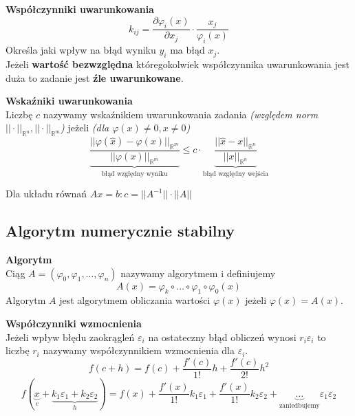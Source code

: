 \documentclass[../mn-notatki.tex]{subfiles}
\begin{document}
\begin{tcolorbox}
\textbf{Współczynniki uwarunkowania}\\
\[
k_{ij} = \frac{\partial \varphi_i(x)}{\partial x_j} \cdot \frac{x_j}{\varphi_i(x)}
\]
    Określa jaki wpływ na błąd wyniku $y_i$ ma błąd $x_j$.\\
     Jeżeli \textbf{wartość bezwzględna} któregokolwiek współczynnika
uwarunkowania jest duża to zadanie jest \textbf{źle uwarunkowane}.

\end{tcolorbox}

\begin{tcolorbox}
\textbf{Wskaźniki uwarunkowania}\\
Liczbę $c$ nazywamy wskaźnikiem uwarunkowania zadania
\textit{(względem norm $||\cdot||_{\mathbb{R}^n}, ||\cdot||_{\mathbb{R}^m}$)}
jeżeli \textit{(dla $\varphi(x) \neq 0, x \neq 0$)}
\[
\underbrace{\frac{||\varphi(\hat{x}) - \varphi(x)||_{\mathbb{R}^m}}{||\varphi(x)||_{\mathbb{R}^m}}}_{\text{błąd względny wyniku}}
\leqslant
c  \cdot
\underbrace{\frac{||\hat{x} - x||_{\mathbb{R}^n}}{||x||_{\mathbb{R}^n}}}_{\text{błąd względny wejścia}}
\]

Dla układu równań
$Ax = b :
c = || A^ {−1}|| \cdot ||A||$
\end{tcolorbox}

\subsection{Algorytm numerycznie stabilny}

\begin{tcolorbox}
\textbf{Algorytm}\\
Ciąg $A = (\varphi_0, \varphi_1, \ldots, \varphi_n)$ nazywamy algorytmem i definiujemy
\[
A(x) = \varphi_k \circ \ldots \circ \varphi_1 \circ \varphi_0(x)
\]
Algorytm $A$ jest algorytmem obliczania wartości $\varphi(x)$ jeżeli
$\varphi(x) = A(x)$.
\end{tcolorbox}

\begin{tcolorbox}
\textbf{Współczynniki wzmocnienia}\\
Jeżeli wpływ błędu zaokrągleń $\varepsilon_i$ na ostateczny błąd obliczeń
wynosi $r_i \varepsilon_i$ to liczbę $r_i$ nazywamy współczynnikiem wzmocnienia
dla $\varepsilon_i$.
\[
f(c + h) =
f(c) +
\frac{f'(c)}{1!} h +
\frac{f'(c)}{2!} h^2
\]
\[
f(\underbrace{x}_{c} + \underbrace{k_1 \varepsilon_1 + k_2 \varepsilon_2}_h) =
f(x) +
\frac{f'(x)}{1!} k_1 \varepsilon_1 +
\frac{f'(x)}{1!} k_2 \varepsilon_2 +
\underbrace{\ldots}_{\text{zaniedbujemy}} \varepsilon_1 \varepsilon_2
\]
\end{tcolorbox}
\end{document}
